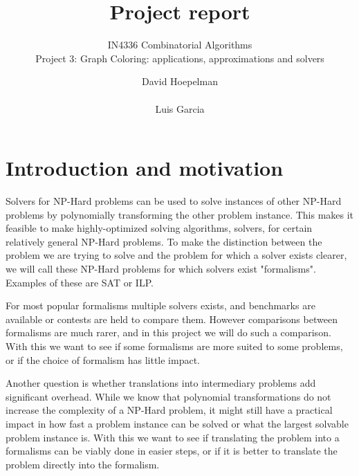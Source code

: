 \documentclass{sig-alternate}
\begin{document}
\title{Project report}

\subtitle{IN4336 Combinatorial Algorithms\\Project 3: Graph Coloring: applications, approximations and
solvers}


\author{
\alignauthor
David Hoepelman\\
       \\
\alignauthor
Luis Garcia\\
}

\maketitle


\begin{abstract}

\end{abstract}

\section{Introduction and motivation}

Solvers for NP-Hard problems can be used to solve instances of other NP-Hard problems by polynomially transforming the other problem instance.
This makes it feasible to make highly-optimized solving algorithms, solvers, for certain relatively general NP-Hard problems.
To make the distinction between the problem we are trying to solve and the problem for which a solver exists clearer, we will call these NP-Hard problems for which solvers exist "formalisms".
Examples of these are SAT or ILP.

For most popular formalisms multiple solvers exists, and benchmarks are available or contests are held to compare them.
However comparisons between formalisms are much rarer, and in this project we will do such a comparison.
With this we want to see if some formalisms are more suited to some problems, or if the choice of formalism has little impact.

Another question is whether translations into intermediary problems add significant overhead.
While we know that polynomial transformations do not increase the complexity of a NP-Hard problem, it might still have a practical impact in how fast a problem instance can be solved or what the largest solvable problem instance is.
With this we want to see if translating the problem into a formalisms can be viably done in easier steps, or if it is better to translate the problem directly into the formalism.
\end{document}
